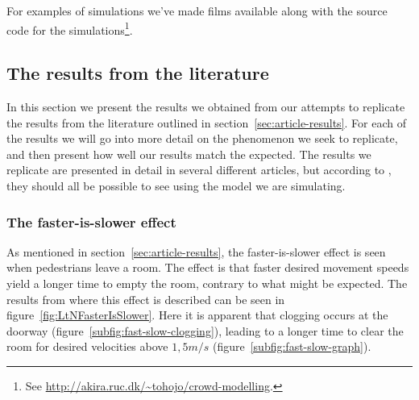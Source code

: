 For examples of simulations we've made films available along with the source 
code for the simulations\footnote{See 
\url{http://akira.ruc.dk/~tohojo/crowd-modelling}.}.

\subsection{The results from the literature}\label{subsec:ThePhenomena}
In this section we present the results we obtained from our attempts
to replicate the results from the literature outlined in 
section~\ref{sec:article-results}.  For each of the results we will go into 
more detail on the phenomenon we seek to replicate, and then present how 
well our results match the expected. The results we replicate are presented in 
detail in several different articles, but according to \cite{self-org}, they 
should all be possible to see using the model we are simulating.

\subsubsection{The faster-is-slower effect}
As mentioned in section~\ref{sec:article-results}, the faster-is-slower effect 
is seen when pedestrians leave a room. The effect is that faster desired 
movement speeds yield a longer time to empty the room, contrary to what might 
be expected. The results from \cite{helbing00} where this effect is described 
can be seen in figure~\ref{fig:LtNFasterIsSlower}. Here it is apparent that 
clogging occurs at the doorway (figure~\ref{subfig:fast-slow-clogging}), 
leading to a longer time to clear the room for desired velocities above 
$1,5m/s$ (figure~\ref{subfig:fast-slow-graph}).

